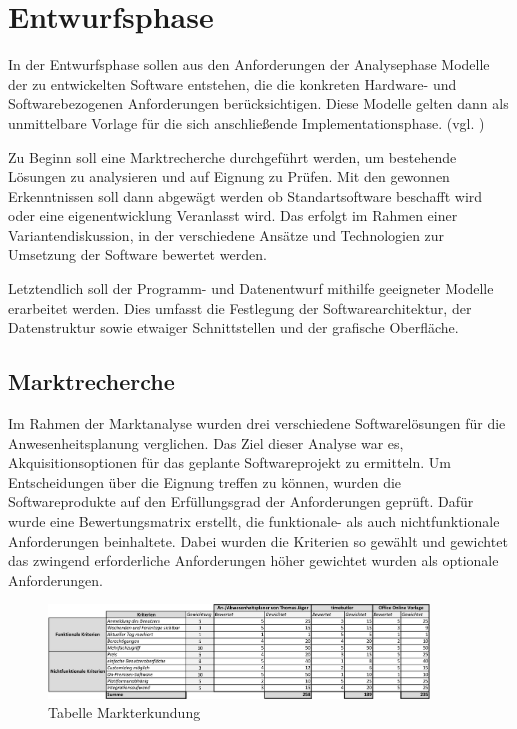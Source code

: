 \section{Entwurfsphase}
\label{sec:Entwurfsphase}
In der Entwurfsphase sollen aus den Anforderungen der Analysephase Modelle der zu entwickelten Software entstehen, die die konkreten Hardware- und Softwarebezogenen Anforderungen berücksichtigen. Diese Modelle gelten dann als unmittelbare Vorlage für die sich anschließende Implementationsphase. (vgl. \cite[S. 69]{dumke-2003})

Zu Beginn soll eine Marktrecherche durchgeführt werden, um bestehende Lösungen zu analysieren und auf Eignung zu Prüfen. Mit den gewonnen Erkenntnissen soll dann abgewägt werden ob Standartsoftware beschafft wird oder eine eigenentwicklung Veranlasst wird. Das erfolgt im Rahmen einer Variantendiskussion, in der verschiedene Ansätze und Technologien zur Umsetzung der Software bewertet werden.

Letztendlich soll der Programm- und Datenentwurf mithilfe geeigneter Modelle erarbeitet werden. Dies umfasst die Festlegung der Softwarearchitektur, der Datenstruktur sowie etwaiger Schnittstellen und der grafische Oberfläche.

\subsection{Marktrecherche}
\label{sec:Marktrecherche}
Im Rahmen der Marktanalyse wurden drei verschiedene Softwarelösungen für die Anwesenheitsplanung verglichen. Das Ziel dieser Analyse war es, Akquisitionsoptionen für das geplante Softwareprojekt zu ermitteln. Um Entscheidungen über die Eignung treffen zu können, wurden die Softwareprodukte auf den Erfüllungsgrad der Anforderungen geprüft. Dafür wurde eine Bewertungsmatrix erstellt, die funktionale- als auch nichtfunktionale Anforderungen beinhaltete. Dabei wurden die Kriterien so gewählt und gewichtet das zwingend erforderliche Anforderungen höher gewichtet wurden als optionale Anforderungen.

\begin{figure}[htb]
    \centering
    \includegraphics[width=0.9\textwidth,angle=0]{abb/Markterkundung.pdf}
    \caption[Beschreibung]{ Tabelle Markterkundung}
    \label{tab:Markterkundung}
\end{figure}

